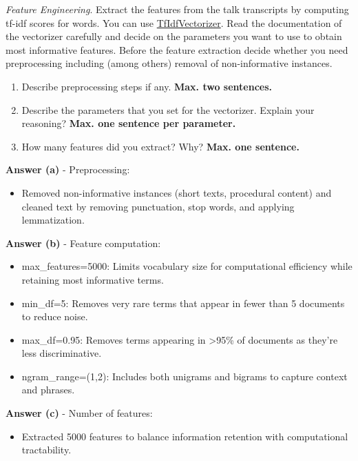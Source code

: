 \documentclass[a4paper,10pt]{article}
\begin{document}
\begin{enumerate}[topsep=0mm, partopsep=0mm, leftmargin=*]

{\color{blue}	
\item\textit{Feature Engineering}. Extract the features from the talk transcripts by computing tf-idf scores for words. You can use \href{https://scikit-learn.org/stable/modules/generated/sklearn.feature_extraction.text.TfidfVectorizer.html}{TfIdfVectorizer}. Read the documentation of the vectorizer carefully and decide on the parameters you want to use to obtain most informative features. Before the feature extraction decide whether you need preprocessing including (among others) removal of non-informative instances.
\begin{enumerate}
	\item Describe preprocessing steps if any. {\color{red}\textbf{Max. two sentences.}}
	\item Describe the parameters that you set for the vectorizer. Explain your reasoning? {\color{red}\textbf{Max. one sentence per parameter.}}
	\item How many features did you extract? Why? {\color{red}\textbf{Max. one sentence.}}
\end{enumerate}
}


\textbf{Answer (a)} - Preprocessing:
\begin{itemize}
	\item Removed non-informative instances (short texts, procedural content) and cleaned text by removing punctuation, stop words, and applying lemmatization.
\end{itemize}

\textbf{Answer (b)} - Feature computation:
\begin{itemize}
	\item max\_features=5000: Limits vocabulary size for computational efficiency while retaining most informative terms.
	\item min\_df=5: Removes very rare terms that appear in fewer than 5 documents to reduce noise.
	\item max\_df=0.95: Removes terms appearing in >95\% of documents as they're less discriminative.
	\item ngram\_range=(1,2): Includes both unigrams and bigrams to capture context and phrases.
\end{itemize}

\textbf{Answer (c)} - Number of features:
\begin{itemize}
	\item Extracted 5000 features to balance information retention with computational tractability.
\end{itemize}



\end{enumerate}
\end{document}
